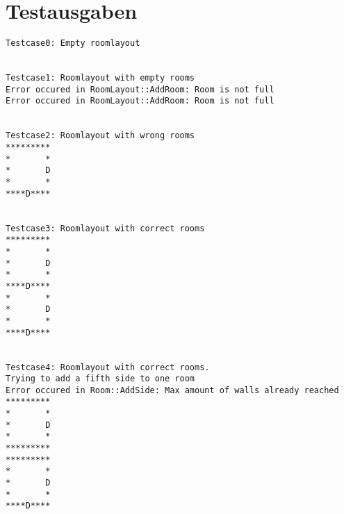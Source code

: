 \documentclass[12pt,a4paper]{article}
\begin{document}
%
%
%
%
%
%
%
%
%
%
%
%
%
%
%
%
%
%
%
%
%
%
%


\newpage
\section {Testausgaben} 

\begin {verbatim}
Testcase0: Empty roomlayout


Testcase1: Roomlayout with empty rooms
Error occured in RoomLayout::AddRoom: Room is not full
Error occured in RoomLayout::AddRoom: Room is not full


Testcase2: Roomlayout with wrong rooms
*********
*       *
*       D
*       *
****D****


Testcase3: Roomlayout with correct rooms
*********
*       *
*       D
*       *
****D****
*       *
*       D
*       *
****D****


Testcase4: Roomlayout with correct rooms.
Trying to add a fifth side to one room
Error occured in Room::AddSide: Max amount of walls already reached
*********
*       *
*       D
*       *
*********
*********
*       *
*       D
*       *
****D****
\end {verbatim}
\end{document}
